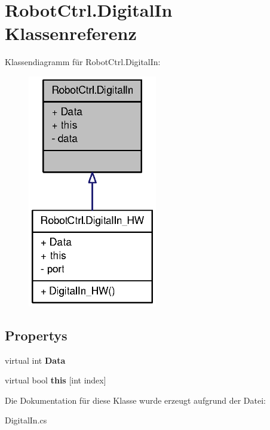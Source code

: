 \hypertarget{class_robot_ctrl_1_1_digital_in}{
\section{RobotCtrl.DigitalIn Klassenreferenz}
\label{class_robot_ctrl_1_1_digital_in}
}


Klassendiagramm für RobotCtrl.DigitalIn:\nopagebreak
\begin{figure}[H]
\begin{center}
\leavevmode
\includegraphics[width=160pt]{class_robot_ctrl_1_1_digital_in__inherit__graph}
\end{center}
\end{figure}
\subsection*{Propertys}
\begin{DoxyCompactItemize}
\item 
\hypertarget{class_robot_ctrl_1_1_digital_in_a9f730b21d4845684a1e085293d2cba50}{
virtual int {\bfseries Data}}
\label{class_robot_ctrl_1_1_digital_in_a9f730b21d4845684a1e085293d2cba50}

\item 
\hypertarget{class_robot_ctrl_1_1_digital_in_adabed7783bc3ad5603e1adbf2bc37484}{
virtual bool {\bfseries this} \mbox{[}int index\mbox{]}}
\label{class_robot_ctrl_1_1_digital_in_adabed7783bc3ad5603e1adbf2bc37484}

\end{DoxyCompactItemize}


Die Dokumentation für diese Klasse wurde erzeugt aufgrund der Datei:\begin{DoxyCompactItemize}
\item 
DigitalIn.cs\end{DoxyCompactItemize}
